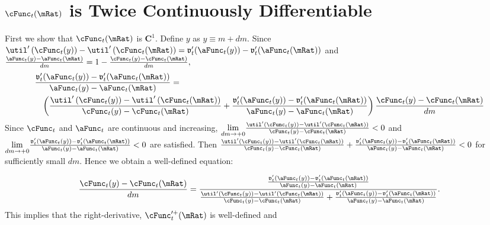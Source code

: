 \documentclass[titlepage]{\econtex}\providecommand{\texname}{BufferStockTheory}%
\begin{document}
\section{$\cFunc_{t}(\mRat)$ is Twice Continuously Differentiable}\label{sec:CIsTwiceDifferentiable}

First we show that $\cFunc_{t}(\mRat)$ is $\mathbf{C}^{1}.$ Define $y$ as
$y\equiv m+dm$.
  Since $\util^{\prime }\left( \cFunc_{t}(y)\right) -\util^{\prime }\left(
    \cFunc_{t}(\mRat)\right) =\mathfrak{v}_{t}^{\prime
  }({\aFunc}_{t}(y))-\mathfrak{v}_{t}^{\prime }({\aFunc}_{t}(\mRat))$ and $
  \frac{{\aFunc}_{t}(y)-{\aFunc}_{t}(\mRat)}{dm}=1-\frac{\cFunc_{t}(y)-\cFunc_{t}(\mRat)}{dm},$
\begin{eqnarray*}
\lefteqn{\frac{\mathfrak{v}_{t}^{\prime }({\aFunc}_{t}(y))-\mathfrak{v}_{t}^{\prime }({\aFunc}_{t}(\mRat))}{{\aFunc}_{t}(y)-{\aFunc}_{t}(\mRat)} =}   & & \\
 & & \left( \frac{\util^{\prime }\left( \cFunc_{t}(y)\right) -\util^{\prime }\left( \cFunc_{t}(\mRat)\right) }{\cFunc_{t}(y)-\cFunc_{t}(\mRat)}+\frac{\mathfrak{v}_{t}^{\prime }({\aFunc}_{t}(y))-\mathfrak{v}_{t}^{\prime }({\aFunc}_{t}(\mRat))}{{\aFunc}_{t}(y)-{\aFunc}_{t}(\mRat)}\right) \frac{\cFunc_{t}(y)-\cFunc_{t}(\mRat)}{dm}
\end{eqnarray*}
Since $\cFunc_{t}$ and $\aFunc_{t}$ are continuous and increasing, $\underset{
dm\rightarrow +0}{\lim }\frac{\util^{\prime }\left( \cFunc_{t}(y)\right) -\util^{\prime
}\left( \cFunc_{t}(\mRat)\right) }{\cFunc_{t}(y)-\cFunc_{t}(\mRat)}<0$ and
$\underset{dm\rightarrow+0}{\lim }\frac{\mathfrak{v}_{t}^{\prime }({\aFunc}_{t}(y))-\mathfrak{v}_{t}^{\prime }({\aFunc}_{t}(\mRat))}{
{\aFunc}_{t}(y)-{\aFunc}_{t}(\mRat)}< 0$
are satisfied. Then $\frac{\util^{\prime }\left(
\cFunc_{t}(y)\right) -\util^{\prime }\left( \cFunc_{t}(\mRat)\right) }{\cFunc_{t}(y)-\cFunc_{t}(\mRat)}+
\frac{\mathfrak{v}_{t}^{\prime }({\aFunc}_{t}(y))-\mathfrak{v}_{t}^{\prime }({\aFunc}_{t}(\mRat))}{{\aFunc}_{t}(y)-{\aFunc}_{t}(\mRat)}
<0$ for sufficiently small $dm$.
 Hence we obtain a well-defined equation:

\begin{equation*}
\frac{\cFunc_{t}(y)-\cFunc_{t}(\mRat)}{dm}=\frac{\frac{\mathfrak{v}_{t}^{\prime
}({\aFunc}_{t}(y))-\mathfrak{v}_{t}^{\prime }({\aFunc}_{t}(\mRat))}{{\aFunc}_{t}(y)-{\aFunc}_{t}(\mRat)}}{\frac{\util^{\prime
}\left( \cFunc_{t}(y)\right) -\util^{\prime }\left( \cFunc_{t}(\mRat)\right) }{
\cFunc_{t}(y)-\cFunc_{t}(\mRat)}+\frac{\mathfrak{v}_{t}^{\prime }({\aFunc}_{t}(y))-\mathfrak{v}_{t}^{\prime }({\aFunc}_{t}(\mRat))
}{{\aFunc}_{t}(y)-{\aFunc}_{t}(\mRat)}}.
\end{equation*}
This implies that the right-derivative, $\cFunc_{t}^{\prime +}(\mRat)$ is
well-defined and
\end{document}
